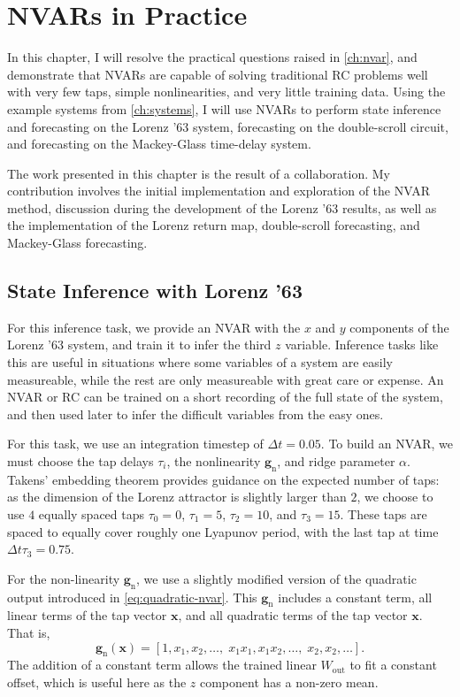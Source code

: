 \chapter{NVARs in Practice}\label{ch:nvar-application}

In this chapter, I will resolve the practical questions raised in
\cref{ch:nvar}, and demonstrate that NVARs are capable of solving
traditional RC problems well with very few taps, simple
nonlinearities, and very little training data. Using the example
systems from \cref{ch:systems}, I will use NVARs to perform state
inference and forecasting on the Lorenz '63 system, forecasting on the
double-scroll circuit, and forecasting on the Mackey-Glass time-delay
system.

The work presented in this chapter is the result of a
collaboration\cite{gauthier2021}. My contribution involves the initial
implementation and exploration of the NVAR method, discussion during
the development of the Lorenz '63 results, as well as the
implementation of the Lorenz return map, double-scroll forecasting,
and Mackey-Glass forecasting.

\section{State Inference with Lorenz '63}

For this inference task, we provide an NVAR with the $x$ and $y$
components of the Lorenz '63 system, and train it to infer the third
$z$ variable. Inference tasks like this are useful in situations where
some variables of a system are easily measureable, while the rest are
only measureable with great care or expense. An NVAR or RC can be
trained on a short recording of the full state of the system, and then
used later to infer the difficult variables from the easy ones.

For this task, we use an integration timestep of $\Delta t = 0.05$. To
build an NVAR, we must choose the tap delays $\tau_i$, the
nonlinearity $\bm{g}_\text{n}$, and ridge parameter $\alpha$. Takens'
embedding theorem\cite{takens1981} provides guidance on the expected
number of taps: as the dimension of the Lorenz attractor is slightly
larger than $2$, we choose to use $4$ equally spaced taps $\tau_0 =
0$, $\tau_1 = 5$, $\tau_2 = 10$, and $\tau_3 = 15$. These taps are
spaced to equally cover roughly one Lyapunov period, with the last tap
at time $\Delta t \tau_3 = 0.75$.

For the non-linearity $\bm{g}_\text{n}$, we use a slightly modified
version of the quadratic output introduced in
\cref{eq:quadratic-nvar}. This $\bm{g}_\text{n}$ includes a constant
term, all linear terms of the tap vector $\bm{x}$, and all quadratic
terms of the tap vector $\bm{x}$. That is,
\begin{equation}
  \label{eq:quadratic-nvar-const}
  \bm{g}_\text{n}(\bm{x}) = [1, x_1, x_2, \dots, \; x_1 x_1, x_1 x_2, \dots, \; x_2, x_2, \dots].
\end{equation}
The addition of a constant term allows the trained linear
$W_\text{out}$ to fit a constant offset, which is useful here as the
$z$ component has a non-zero mean.

